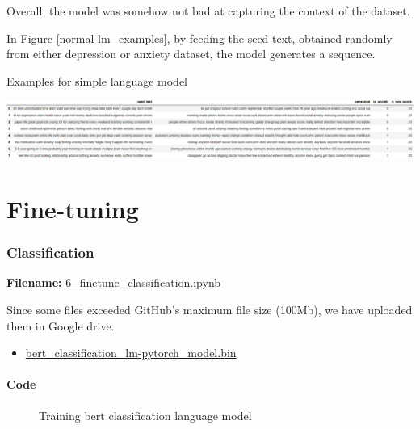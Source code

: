\documentclass[12pt, a4paper]{article}
\begin{document}
Overall, the model was somehow not bad at capturing the context of the dataset. 

In Figure \ref{normal-lm_examples}, by feeding the seed text, obtained randomly from either depression or anxiety dataset, the model generates a sequence.
\begin{table}[H]
	\caption{Examples for simple language model} 
	\centering 
	\vspace{5mm} 
	\includegraphics[width=1.2\linewidth, 
	keepaspectratio]{../reports/images/normal-lm_examples.png}
	\label{normal-lm_examples} 
\end{table}

\newpage
\part{Fine-tuning}

\section{Classification}
\large{\textbf{Filename:} 6\_finetune\_classification.ipynb}

Since some files exceeded GitHub's maximum file size (100Mb), we have uploaded them in Google drive.
\begin{itemize}
	\item \href{https://drive.google.com/file/d/1Lbbhh2N92k3IjuZ5TObauPd2en5qAT6i/view?usp=sharing}{bert\_classification\_lm-pytorch\_model.bin}
\end{itemize}

\subsection{Code}

\begin{figure}[H]
	\caption{Training bert classification language model}
	\label{classification-lm_train}
\end{figure}
\end{document}
